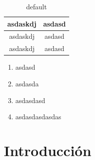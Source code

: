 \documentclass[10pt]{book}
\begin{document}
\begin{table}[htbp]
\caption{default}
\begin{center}
\begin{tabular}{|c|c|}
	\hline
	\rowcolor{colorAgua}asdaskdj & asdasd\\
	\hline
	asdaskdj & asdasd\\
	\hline
	asdaskdj & asdasd\\
	\hline
\end{tabular}
\end{center}
\label{default}
\end{table}%


\begin{enumerate}
	\item asdasd
	\item asdasda
	\item asdasdasd
	\item asdasdasdasdas
\end{enumerate}


\chapter{Introducción}

\end{document}
